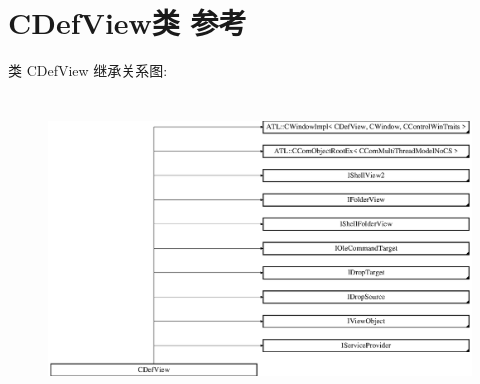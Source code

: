 \hypertarget{class_c_def_view}{}\section{C\+Def\+View类 参考}
\label{class_c_def_view}
类 C\+Def\+View 继承关系图\+:\begin{figure}[H]
\begin{center}
\leavevmode
\includegraphics[height=8.148149cm]{class_c_def_view}
\end{center}
\end{figure}

